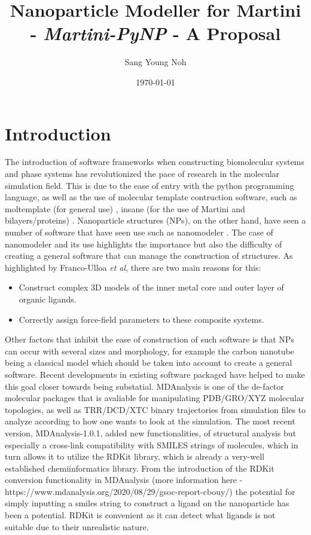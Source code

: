 \documentclass[12pt]{article}
\begin{document}
\title{Nanoparticle Modeller for Martini - \emph{Martini-PyNP} - A Proposal}
\author{Sang Young Noh}
\date{\today}
\maketitle
\section{Introduction}
The introduction of software frameworks when constructing biomolecular systems and phase systems has revolutionized the pace of research in the
molecular simulation field. This is due to the ease of entry with the python programming language, as well as the use of molecular template contruction software,
such as moltemplate (for general use) \cite{Moltemplate}, insane (for the use of Martini and bilayers/proteins) \cite{INSANE}. Nanoparticle structures (NPs), on the other hand, have seen a number of software that have seen use such as nanomodeler \cite{Nanomodeller}. The case of nanomodeler and its use highlights the importance but also the difficulty of creating a general software that can manage the
construction of structures. As highlighted by Franco-Ulloa \emph{et al}, there are two main reasons for this:
\begin{itemize}
\item Construct complex 3D models of the inner metal core and outer layer of organic ligands.
\item Correctly assign force-field parameters to these composite systems.
\end{itemize} 
Other factors that inhibit the ease of construction of such software is that NPs can occur with several sizes and morphology, for example the carbon nanotube being a classical
model which should be taken into account to create a general software. 
\newline
\newline
Recent developments in existing software packaged have helped to make this goal closer towards being substatial. MDAnalysis is one of the de-factor molecular packages that
is avaliable for manipulating PDB/GRO/XYZ molecular topologies, as well as TRR/DCD/XTC binary trajectories from simulation files to analyze according to how one wants to look at the simulation. 
The most recent version, MDAnalysis-1.0.1, added new functionalities, of structural analysis but especially a cross-link compatibility with SMILES strings of molecules, which in turn
allows it to utilize the RDKit library, which is already a very-well established chemiinformatics library. From the introduction of the RDKit conversion functionality in MDAnalysis (more information here - https://www.mdanalysis.org/2020/08/29/gsoc-report-cbouy/) the potential for simply inputting a smiles string to construct a ligand on the nanoparticle has been a potential. RDKit is convenient as it can detect what ligands is not suitable due to their unrealistic nature.
\end{document}
